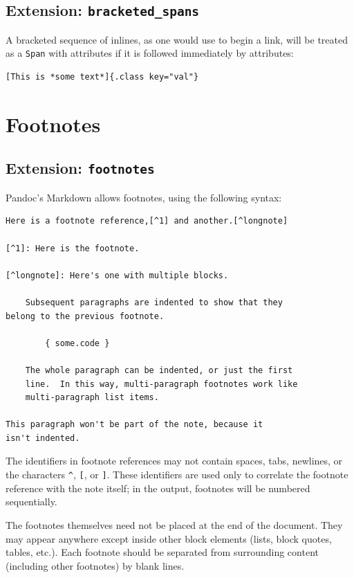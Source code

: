 \documentclass[
  b5paper
]{book}
\begin{document}
\subsection{\texorpdfstring{Extension:
\texttt{bracketed\_spans}}{Extension: bracketed\_spans}}\label{extension-bracketed_spans}

A bracketed sequence of inlines, as one would use to begin a link, will
be treated as a \texttt{Span} with attributes if it is followed
immediately by attributes:

\begin{verbatim}
[This is *some text*]{.class key="val"}
\end{verbatim}

\section{Footnotes}\label{footnotes}

\subsection{\texorpdfstring{Extension:
\texttt{footnotes}}{Extension: footnotes}}\label{extension-footnotes}

Pandoc's Markdown allows footnotes, using the following syntax:

\begin{verbatim}
Here is a footnote reference,[^1] and another.[^longnote]

[^1]: Here is the footnote.

[^longnote]: Here's one with multiple blocks.

    Subsequent paragraphs are indented to show that they
belong to the previous footnote.

        { some.code }

    The whole paragraph can be indented, or just the first
    line.  In this way, multi-paragraph footnotes work like
    multi-paragraph list items.

This paragraph won't be part of the note, because it
isn't indented.
\end{verbatim}

The identifiers in footnote references may not contain spaces, tabs,
newlines, or the characters \texttt{\^{}}, \texttt{{[}}, or
\texttt{{]}}. These identifiers are used only to correlate the footnote
reference with the note itself; in the output, footnotes will be
numbered sequentially.

The footnotes themselves need not be placed at the end of the document.
They may appear anywhere except inside other block elements (lists,
block quotes, tables, etc.). Each footnote should be separated from
surrounding content (including other footnotes) by blank lines.
\end{document}
